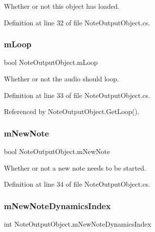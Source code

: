 Whether or not this object has loaded. 



Definition at line 32 of file Note\+Output\+Object.\+cs.

\mbox{\label{group___n_o_o_priv_var_gabf1d5013f44773e9fd3e4dbb59d74aeb}} 
\subsubsection{\texorpdfstring{m\+Loop}{mLoop}}
{\footnotesize\ttfamily bool Note\+Output\+Object.\+m\+Loop\hspace{0.3cm}{\ttfamily [private]}}



Whether or not the audio should loop. 



Definition at line 33 of file Note\+Output\+Object.\+cs.



Referenced by Note\+Output\+Object.\+Get\+Loop().

\mbox{\label{group___n_o_o_priv_var_gac537ec036adf0645dca2f31fbc5b3dec}} 
\subsubsection{\texorpdfstring{m\+New\+Note}{mNewNote}}
{\footnotesize\ttfamily bool Note\+Output\+Object.\+m\+New\+Note\hspace{0.3cm}{\ttfamily [private]}}



Whether or not a new note needs to be started. 



Definition at line 34 of file Note\+Output\+Object.\+cs.

\mbox{\label{group___n_o_o_priv_var_ga13de232048b35fc513f8aa3eeef65de0}} 
\subsubsection{\texorpdfstring{m\+New\+Note\+Dynamics\+Index}{mNewNoteDynamicsIndex}}
{\footnotesize\ttfamily int Note\+Output\+Object.\+m\+New\+Note\+Dynamics\+Index\hspace{0.3cm}{\ttfamily [private]}}



